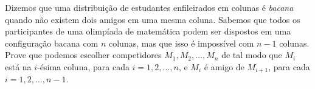 Dizemos que uma distribuição de estudantes enfileirados em colunas é \textit{bacana} quando não existem dois amigos em uma mesma coluna.
Sabemos que todos os participantes de uma olimpíada de matemática podem ser dispostos em uma configuração bacana com $n$ colunas, mas que isso é impossível com $n-1$ colunas.
Prove que podemos escolher competidores $M_1, M_2, \dots, M_n$ de tal modo que $M_i$ está na $i$-ésima coluna, para cada $i = 1, 2, \dots, n$, e $M_i$ é amigo de $M_{i+1}$, para cada $i = 1, 2, \dots, n-1$.
